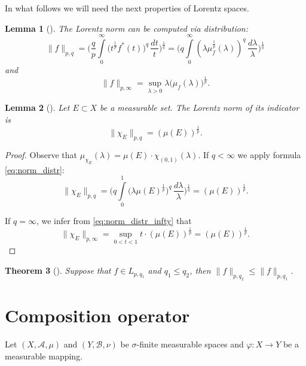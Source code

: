 \documentclass{birkjour}
\newtheorem{thm}{Theorem}[section]
\newtheorem{lem}[thm]{Lemma}
\theoremstyle{definition}
\theoremstyle{remark}
\numberwithin{equation}{section}
\begin{document}
In what follows we will need the next properties of Lorentz spaces.
\begin{lem}[{\cite[Proposition 2.1.]{KKM}}] %
The Lorentz norm can be computed via distribution:
\begin{equation}\label{eq:norm_distr}
\|f\|_{p,q} = \Bigg(\frac{q}{p}\int\limits_{0}^{\infty}\big(t^{\frac{1}{p}}f^*(t)\big)^q\,\frac{dt}{t}\Bigg)^{\frac{1}{q}} 
= \Bigg(q\int\limits_{0}^{\infty}\left(\lambda\mu_{f}^{\frac{1}{p}}(\lambda)\right)^q\,\frac{d\lambda}{\lambda}\Bigg)^{\frac{1}{q}}
\end{equation}
and
\begin{equation}\label{eq:norm_distr_infty}
\|f\|_{p,\infty} = \sup\limits_{\lambda>0}\lambda\big(\mu_{f}(\lambda)\big)^{\frac{1}{p}}.
\end{equation}
\end{lem}
\begin{lem}[{\cite[equation (2.10)]{SW}}]
Let $E\subset X$ be a measurable set. 
The Lorentz norm of its indicator is 
\begin{equation}\label{eq:lemma_indicator_norm}
\|\chi_E\|_{p,q} = (\mu(E))^{\frac{1}{p}}. 
\end{equation}
\end{lem}
\begin{proof}
Observe that $\mu_{\chi_E}(\lambda) = \mu(E)\cdot\chi_{(0,1)}(\lambda)$. If $q<\infty$ we apply formula \eqref{eq:norm_distr}:
$$
\|\chi_E\|_{p,q} = \Bigg(q\int\limits_{0}^{1}\big(\lambda\mu(E)^{\frac{1}{p}}\big)^q\,\frac{d\lambda}{\lambda}\Bigg)^{\frac{1}{q}} = (\mu(E))^{\frac{1}{p}}.
$$ 

If $q=\infty$, we infer from \eqref{eq:norm_distr_infty}  that 
$$\|\chi_E\|_{p,\infty} = \sup\limits_{0<t<1}t\cdot (\mu(E))^{\frac{1}{p}} = (\mu(E))^{\frac{1}{p}}.$$
\end{proof}	

\begin{thm}[{\cite[Theorem 3.11]{SW}}]
Suppose that $f\in L_{p,q_1}$ and $q_1\leq q_2$, then $\|f\|_{p,q_2}\leq \|f\|_{p,q_1}$. 
\end{thm}


\section{Composition operator}\label{comp}
Let $(X,\mathcal A, \mu)$ and $(Y,\mathcal B, \nu)$ be  $\sigma$-finite measurable spaces and 
$\varphi:X\to Y$ be a measurable mapping.
\end{document}
